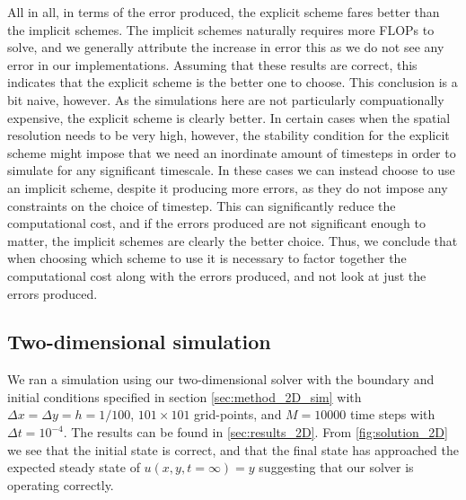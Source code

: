 \documentclass[reprint,english,notitlepage]{revtex4-1}  %
\begin{document}
All in all, in terms of the error produced, the explicit scheme fares better than the implicit schemes. The implicit schemes naturally requires more FLOPs to solve, and we generally attribute the increase in error this as we do not see any error in our implementations. Assuming that these results are correct, this indicates that the explicit scheme is the better one to choose. This conclusion is a bit naive, however. As the simulations here are not particularly compuationally expensive, the explicit scheme is clearly better. In certain cases when the spatial resolution needs to be very high, however, the stability condition for the explicit scheme might impose that we need an inordinate amount of timesteps in order to simulate for any significant timescale. In these cases we can instead choose to use an implicit scheme, despite it producing more errors, as they do not impose any constraints on the choice of timestep. This can significantly reduce the computational cost, and if the errors produced are not significant enough to matter, the implicit schemes are clearly the better choice. Thus, we conclude that when choosing which scheme to use it is necessary to factor together the computational cost along with the errors produced, and not look at just the errors produced.    

\subsection{Two-dimensional simulation} \label{sec:discussion_2D}
We ran a simulation using our two-dimensional solver with the boundary and initial conditions specified in section \ref{sec:method_2D_sim} with \(\Delta x = \Delta y = h = 1/100\), \(101\times 101\) grid-points, and \(M = 10000\) time steps with \(\Delta t = 10^{-4}\). The results can be found in \autoref{sec:results_2D}. From \autoref{fig:solution_2D} we see that the initial state is correct, and that the final state has approached the expected steady state of \(u(x, y, t=\infty) = y\) suggesting that our solver is operating correctly.
\end{document}
